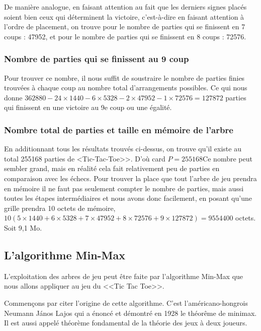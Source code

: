 \documentclass{article}
\begin{document}
De manière analogue, en faisant attention au fait que les derniers signes placés soient bien ceux qui déterminent la victoire, c'est-à-dire en faisant attention à l'ordre de placement, on trouve pour le nombre de parties qui se finissent en 7 coups : 47952, et pour le nombre de parties qui se finissent en 8 coups : 72576.

\subsubsection{Nombre de parties qui se finissent au 9 coup}

Pour trouver ce nombre, il nous suffit de soustraire le nombre de parties finies trouvées à chaque coup au nombre total d'arrangements possibles. Ce qui nous donne $362880- 24 \times 1440 - 6 \times 5328 - 2 \times 47952 - 1 \times 72576 = 127872$ parties qui finissent en une victoire au 9e coup ou une égalité.

\subsubsection{Nombre total de parties et taille en mémoire de l'arbre}

En additionnant tous les résultats trouvés ci-dessus, on trouve qu'il existe au total 255168 parties de <Tic-Tac-Toe>>. D'où card $P = 255168$Ce nombre peut sembler grand, mais en réalité cela fait relativement peu de parties en comparaison avec les échecs. 
Pour trouver la place que tout l'arbre de jeu prendra en mémoire il ne faut pas seulement compter le nombre de parties, mais aussi toutes les étapes intermédiaires et nous avons donc facilement, en posant qu'une grille prendra 10 octets de mémoire, $10(5 \times 1440 + 6 \times 5328 + 7 \times 47952 + 8 \times 72576 + 9 \times 127872) = 9554400$ octets. Soit 9,1 Mo.

\subsection{L'algorithme Min-Max}

L'exploitation des arbres de jeu peut être faite par l'algorithme Min-Max
que nous allons appliquer au jeu du <<Tic Tac Toe>>. 

Commençons par citer l'origine de cette algorithme. 
C'est l'américano-hongrois Neumann János Lajos qui a énoncé et démontré en 1928 le théorême de minimax.
Il est aussi appelé théorème fondamental de la théorie des jeux à deux joueurs.
\end{document}
